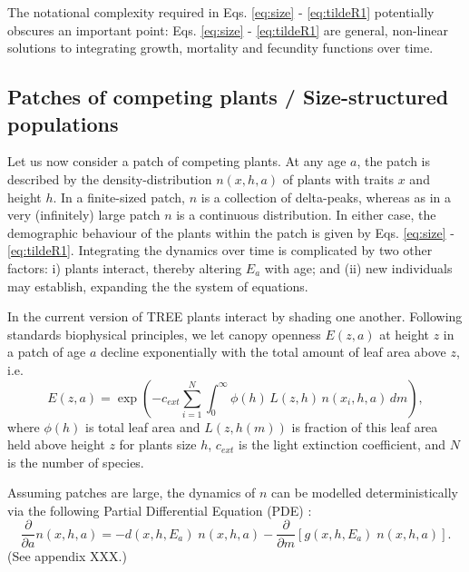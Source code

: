 \documentclass[10pt,twoside]{article}
\begin{document}
The notational complexity required in Eqs. \ref{eq:size} -
\ref{eq:tildeR1} potentially obscures an important point: Eqs.
\ref{eq:size} - \ref{eq:tildeR1} are general, non-linear solutions to
integrating growth, mortality and fecundity functions over time.

\subsection{Patches of competing plants / Size-structured
populations}\label{patches-of-competing-plants-size-structured-populations}

Let us now consider a patch of competing plants. At any age \(a\), the
patch is described by the density-distribution \(n(x,h,a)\) of plants
with traits \(x\) and height \(h\). In a finite-sized patch, \(n\) is a
collection of delta-peaks, whereas as in a very (infinitely) large patch
\(n\) is a continuous distribution. In either case, the demographic
behaviour of the plants within the patch is given by Eqs. \ref{eq:size}
- \ref{eq:tildeR1}. Integrating the dynamics over time is complicated by
two other factors: i) plants interact, thereby altering \(E_a\) with
age; and (ii) new individuals may establish, expanding the the system of
equations.

In the current version of TREE plants interact by shading one another.
Following standards biophysical principles, we let canopy openness
\(E(z,a)\) at height \(z\) in a patch of age \(a\) decline exponentially
with the total amount of leaf area above \(z\), i.e.
\begin{equation} \label{eq:light}
  E(z,a) = \exp \left(-c_{ext}  \sum_{i=1}^{N} \int_{0}^{\infty} \phi(h) \, L(z, h) \, n(x_i,h,a) \, dm \right),
\end{equation}
where \(\phi(h)\) is total leaf area and \(L(z, h(m))\) is fraction of
this leaf area held above height \(z\) for plants size \(h\),
\(c_{ext}\) is the light extinction coefficient, and \(N\) is the number
of species.

Assuming patches are large, the dynamics of \(n\) can be modelled
deterministically via the following Partial Differential Equation (PDE)
\citep{Kohyama-1993, Deroos-1997, Moorcroft-2001}:
\begin{equation} \label{eq:PDE} 
  \frac{\partial }{\partial a} n(x,h,a)= -d(x,h, E_a) \; n(x,h,a)-\frac{\partial }{\partial m} \left[g(x,h,E_a) \; n(x,h,a)\right].
\end{equation}
(See appendix XXX.)
\end{document}
